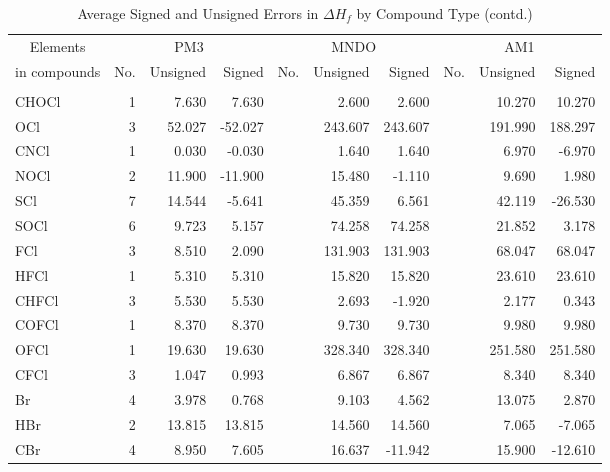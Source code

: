 \begin{table}
\caption{\label{avehofb}Average Signed and Unsigned Errors in $\Delta H_f$ by
 Compound Type (contd.)}
\compresstable
\begin{center}
\begin{tabular}{lrrrrrrrrr}
\multicolumn{1}{c}{Elements} & \multicolumn{3}{c}{PM3} & \multicolumn{3}{c}{MNDO} &
\multicolumn{3}{c}{AM1} \\
\multicolumn{1}{c}{in compounds} &  No. & Unsigned & Signed & No. & Unsigned & Signed & No. & Unsigned & Signed \\
\hline\\
      CHOCl   &      1 &    7.630 &    7.630 &  &    2.600 &    2.600 &  &   10.270 &   10.270 \\
      OCl     &      3 &   52.027 &  -52.027 &  &  243.607 &  243.607 &  &  191.990 &  188.297 \\
      CNCl    &      1 &    0.030 &   -0.030 &  &    1.640 &    1.640 &  &    6.970 &   -6.970 \\
      NOCl    &      2 &   11.900 &  -11.900 &  &   15.480 &   -1.110 &  &    9.690 &    1.980 \\
      SCl     &      7 &   14.544 &   -5.641 &  &   45.359 &    6.561 &  &   42.119 &  -26.530 \\
      SOCl    &      6 &    9.723 &    5.157 &  &   74.258 &   74.258 &  &   21.852 &    3.178 \\
      FCl     &      3 &    8.510 &    2.090 &  &  131.903 &  131.903 &  &   68.047 &   68.047 \\
      HFCl    &      1 &    5.310 &    5.310 &  &   15.820 &   15.820 &  &   23.610 &   23.610 \\
      CHFCl   &      3 &    5.530 &    5.530 &  &    2.693 &   -1.920 &  &    2.177 &    0.343 \\
      COFCl   &      1 &    8.370 &    8.370 &  &    9.730 &    9.730 &  &    9.980 &    9.980 \\
      OFCl    &      1 &   19.630 &   19.630 &  &  328.340 &  328.340 &  &  251.580 &  251.580 \\
      CFCl    &      3 &    1.047 &    0.993 &  &    6.867 &    6.867 &  &    8.340 &    8.340 \\
      Br      &      4 &    3.978 &    0.768 &  &    9.103 &    4.562 &  &   13.075 &    2.870 \\
      HBr     &      2 &   13.815 &   13.815 &  &   14.560 &   14.560 &  &    7.065 &   -7.065 \\
      CBr     &      4 &    8.950 &    7.605 &  &   16.637 &  -11.942 &  &   15.900 &  -12.610 \\

\end{tabular}
\end{center}
\end{table}
